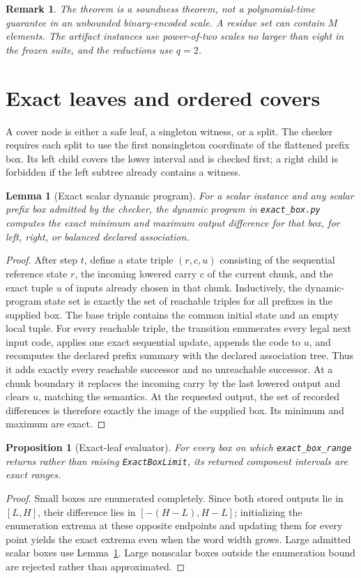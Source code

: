 \documentclass[11pt]{article}
\newtheorem{lemma}[definition]{Lemma}
\newtheorem{proposition}[definition]{Proposition}
\newtheorem{remark}[definition]{Remark}
\begin{document}
\begin{remark}
The theorem is a soundness theorem, not a polynomial-time guarantee in an unbounded binary-encoded scale. A residue set can contain $M$ elements. The artifact instances use power-of-two scales no larger than eight in the frozen suite, and the reductions use $q=2$.
\end{remark}

\section{Exact leaves and ordered covers}
A cover node is either a safe leaf, a singleton witness, or a split. The checker requires each split to use the first nonsingleton coordinate of the flattened prefix box. Its left child covers the lower interval and is checked first; a right child is forbidden if the left subtree already contains a witness.

\begin{lemma}[Exact scalar dynamic program]\label{lem:dp}
For a scalar instance and any scalar prefix box admitted by the checker, the dynamic program in \texttt{exact\_box.py} computes the exact minimum and maximum output difference for that box, for left, right, or balanced declared association.
\end{lemma}
\begin{proof}
After step $t$, define a state triple $(r,c,u)$ consisting of the sequential reference state $r$, the incoming lowered carry $c$ of the current chunk, and the exact tuple $u$ of inputs already chosen in that chunk. Inductively, the dynamic-program state set is exactly the set of reachable triples for all prefixes in the supplied box. The base triple contains the common initial state and an empty local tuple. For every reachable triple, the transition enumerates every legal next input code, applies one exact sequential update, appends the code to $u$, and recomputes the declared prefix summary with the declared association tree. Thus it adds exactly every reachable successor and no unreachable successor. At a chunk boundary it replaces the incoming carry by the last lowered output and clears $u$, matching the semantics. At the requested output, the set of recorded differences is therefore exactly the image of the supplied box. Its minimum and maximum are exact.
\end{proof}

\begin{proposition}[Exact-leaf evaluator]\label{prop:leaf}
For every box on which \texttt{exact\_box\_range} returns rather than raising \texttt{ExactBoxLimit}, its returned component intervals are exact ranges.
\end{proposition}
\begin{proof}
Small boxes are enumerated completely. Since both stored outputs lie in $[L,H]$, their difference lies in $[-(H-L),H-L]$; initializing the enumeration extrema at these opposite endpoints and updating them for every point yields the exact extrema even when the word width grows. Large admitted scalar boxes use Lemma~\ref{lem:dp}. Large nonscalar boxes outside the enumeration bound are rejected rather than approximated.
\end{proof}
\end{document}

